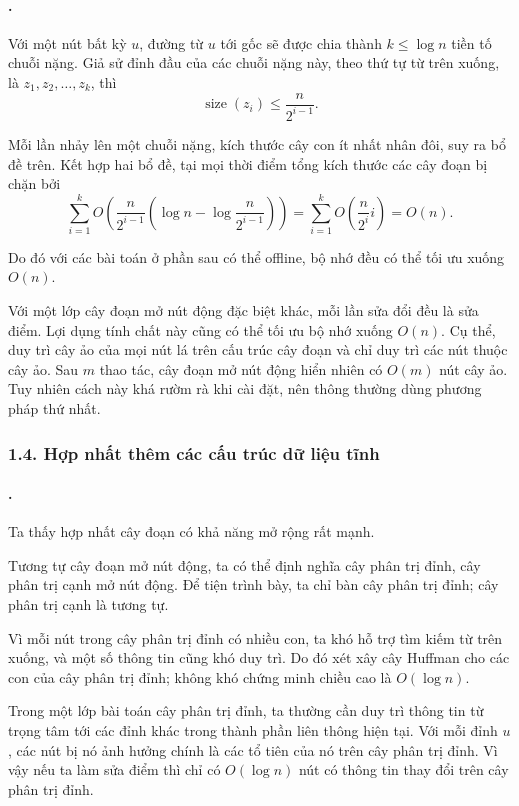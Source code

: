 \documentclass[11pt]{article}
\begin{document}
\paragraph{.}
Với một nút bất kỳ \(u\), đường từ \(u\) tới gốc sẽ được chia thành
\(k\le \log n\) tiền tố chuỗi nặng. Giả sử đỉnh đầu của các chuỗi nặng này,
theo thứ tự từ trên xuống, là \(z_1,z_2,\ldots,z_k\), thì
\[
  \operatorname{size}(z_i)\le \frac{n}{2^{i-1}}.
\]

Mỗi lần nhảy lên một chuỗi nặng, kích thước cây con ít nhất nhân đôi, suy ra bổ
đề trên. Kết hợp hai bổ đề, tại mọi thời điểm tổng kích thước các cây đoạn bị
chặn bởi
\[
  \sum_{i=1}^{k}
  O\!\left(\frac{n}{2^{i-1}}
  \left(\log n-\log\frac{n}{2^{i-1}}\right)\right)
  =
  \sum_{i=1}^{k} O\!\left(\frac{n}{2^i}i\right)=O(n).
\]

Do đó với các bài toán ở phần sau có thể offline, bộ nhớ đều có thể tối ưu xuống
\(O(n)\).

Với một lớp cây đoạn mở nút động đặc biệt khác, mỗi lần sửa đổi đều là sửa điểm.
Lợi dụng tính chất này cũng có thể tối ưu bộ nhớ xuống \(O(n)\). Cụ thể, duy
trì cây ảo của mọi nút lá trên cấu trúc cây đoạn và chỉ duy trì các nút thuộc
cây ảo. Sau \(m\) thao tác, cây đoạn mở nút động hiển nhiên có \(O(m)\) nút cây
ảo. Tuy nhiên cách này khá rườm rà khi cài đặt, nên thông thường dùng phương
pháp thứ nhất.

\subsubsection*{1.4. Hợp nhất thêm các cấu trúc dữ liệu tĩnh}

\paragraph{.}
Ta thấy hợp nhất cây đoạn có khả năng mở rộng rất mạnh.

Tương tự cây đoạn mở nút động, ta có thể định nghĩa cây phân trị đỉnh, cây phân
trị cạnh mở nút động. Để tiện trình bày, ta chỉ bàn cây phân trị đỉnh; cây phân
trị cạnh là tương tự.

Vì mỗi nút trong cây phân trị đỉnh có nhiều con, ta khó hỗ trợ tìm kiếm từ trên
xuống, và một số thông tin cũng khó duy trì. Do đó xét xây cây Huffman cho các
con của cây phân trị đỉnh; không khó chứng minh chiều cao là \(O(\log n)\).

Trong một lớp bài toán cây phân trị đỉnh, ta thường cần duy trì thông tin từ
trọng tâm tới các đỉnh khác trong thành phần liên thông hiện tại. Với mỗi đỉnh
\(u\), các nút bị nó ảnh hưởng chính là các tổ tiên của nó trên cây phân trị
đỉnh. Vì vậy nếu ta làm sửa điểm thì chỉ có \(O(\log n)\) nút có thông tin thay
đổi trên cây phân trị đỉnh.
\end{document}
